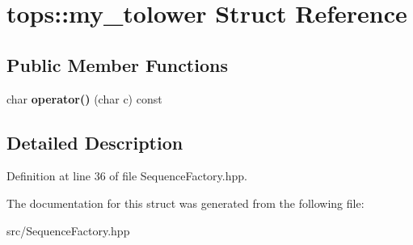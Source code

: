 \hypertarget{structtops_1_1my__tolower}{}\section{tops\+:\+:my\+\_\+tolower Struct Reference}
\label{structtops_1_1my__tolower}
\subsection*{Public Member Functions}
\begin{DoxyCompactItemize}
\item 
\mbox{\label{structtops_1_1my__tolower_a49ddcd53b6758e141587ed1c99729ceb}} 
char {\bfseries operator()} (char c) const
\end{DoxyCompactItemize}


\subsection{Detailed Description}


Definition at line 36 of file Sequence\+Factory.\+hpp.



The documentation for this struct was generated from the following file\+:\begin{DoxyCompactItemize}
\item 
src/Sequence\+Factory.\+hpp\end{DoxyCompactItemize}
